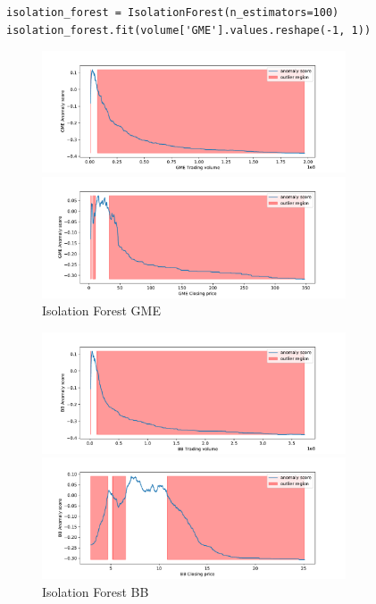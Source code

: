 \documentclass[12pt,twoside]{report}
\begin{document}
\begin{lstlisting}
isolation_forest = IsolationForest(n_estimators=100)
isolation_forest.fit(volume['GME'].values.reshape(-1, 1))
\end{lstlisting}

\begin{figure}[H]
\begin{multicols}{2}
    \includegraphics[width=9cm]{../code/figures/if_trading_GME.pdf}\par 
    \includegraphics[width=9cm]{../code/figures/if_closing_GME.pdf}\par 
\end{multicols}
\caption{Isolation Forest GME}
\label{fig:if-GME}
\end{figure}

\begin{figure}[H]
\begin{multicols}{2}
    \includegraphics[width=9cm]{../code/figures/if_trading_BB.pdf}\par 
    \includegraphics[width=9cm]{../code/figures/if_closing_BB.pdf}\par 
\end{multicols}
\caption{Isolation Forest BB}
\end{figure}
\end{document}
